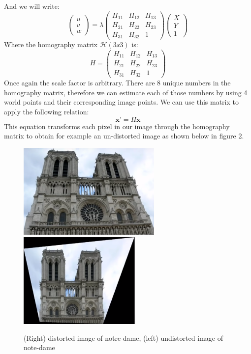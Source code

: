 \documentclass{article}
\begin{document}
And we will write:
\begin{equation}
    \begin{pmatrix} u \\ v \\ w \end{pmatrix} = \lambda\begin{pmatrix} H_{11} & H_{12}  & H_{13} \\ H_{21} & H_{22}  & H_{23} \\ H_{31} & H_{32}  & 1  \end{pmatrix} \begin{pmatrix}
    X \\ Y \\ 1
    \end{pmatrix}
\end{equation}
Where the homography matrix $\mathcal{H (3x3)}$ is:
\begin{equation}
    H = \begin{pmatrix} H_{11} & H_{12}  & H_{13} \\ H_{21} & H_{22}  & H_{23} \\ H_{31} & H_{32}  & 1  \end{pmatrix}
\end{equation}
Once again the scale factor is arbitrary. There are 8 unique numbers in the homography matrix, therefore we can estimate each of those numbers by using 4 world points and their corresponding image points.
We can use this matrix to apply the following relation:
\begin{equation}
    \textbf{x'} = H\textbf{x}
\end{equation}
This equation transforms each pixel in our image through the homography matrix to obtain for example an un-distorted image as shown below in figure 2.

\begin{figure}%
    \centering
    {\includegraphics[width=7cm]{note_dame_distorted.png}}%
    \qquad
    {\includegraphics[width=6cm]{notre_dame_undistorted.png}}%
    \caption{(Right) distorted image of notre-dame, (left) undistorted image of note-dame}%
    \label{fig:example}%
\end{figure}
\end{document}
